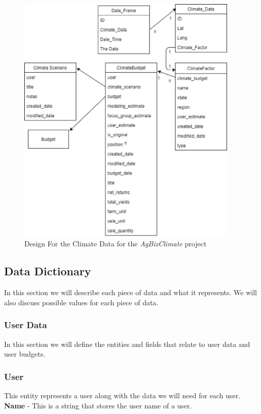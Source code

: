\documentclass[onecolumn, draftclsnofoot,10pt, compsoc]{article}
\begin{document}
		\begin{figure}[htb]
			\begin{center}
				\includegraphics[width=300pt]{UMLDiagrams/ClimateData.eps}
			\end{center}
			\caption{Design For the Climate Data for the \textit{AgBizClimate} project}
			\label{fig:CD1}
		\end{figure}


	\subsection{Data Dictionary}
		In this section we will describe each piece of data and what it represents. We will also discuss possible values for each piece of data.\\
		\subsubsection{User Data}
			In this section we will define the entities and fields that relate to user data and user budgets.\\
			\subsubsection{User}
				This entity represents a user along with the data we will need for each user.\\
				\textbf{Name} - This is a string that stores the user name of a user.\\
\end{document}
